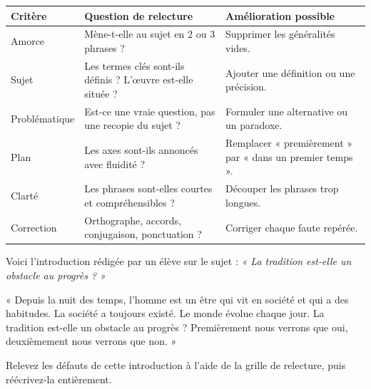 \documentclass[11pt]{article}
\begin{document}
\begin{center}
\begin{tabularx}{\linewidth}{|l|X|X|}
\hline
\rowcolor{popblueL} \textbf{Critère} & \textbf{Question de relecture} & \textbf{Amélioration possible} \\
\hline
Amorce & Mène-t-elle au sujet en 2 ou 3 phrases ? & Supprimer les généralités vides. \\
\hline
Sujet & Les termes clés sont-ils définis ? L'œuvre est-elle située ? & Ajouter une définition ou une précision. \\
\hline
Problématique & Est-ce une vraie question, pas une recopie du sujet ? & Formuler une alternative ou un paradoxe. \\
\hline
Plan & Les axes sont-ils annoncés avec fluidité ? & Remplacer « premièrement » par « dans un premier temps ». \\
\hline
Clarté & Les phrases sont-elles courtes et compréhensibles ? & Découper les phrases trop longues. \\
\hline
Correction & Orthographe, accords, conjugaison, ponctuation ? & Corriger chaque faute repérée. \\
\hline
\end{tabularx}
\end{center}

\begin{exercice}
Voici l'introduction rédigée par un élève sur le sujet : \emph{« La tradition est-elle un obstacle au progrès ? »}

« Depuis la nuit des temps, l'homme est un être qui vit en société et qui a des habitudes. La société a toujours existé. Le monde évolue chaque jour. La tradition est-elle un obstacle au progrès ? Premièrement nous verrons que oui, deuxièmement nous verrons que non. »

Relevez les défauts de cette introduction à l'aide de la grille de relecture, puis réécrivez-la entièrement.
\end{exercice}
\end{document}
